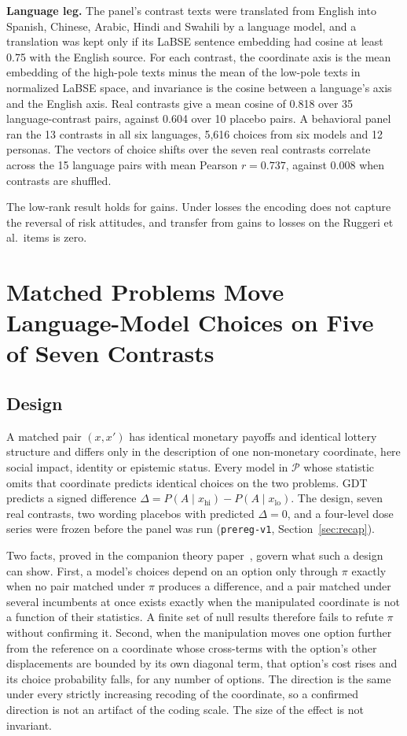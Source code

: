 \documentclass[journal]{IEEEtran}
\newcommand{\Pclass}{\mathcal{P}}          %
\begin{document}
\textbf{Language leg.}
The panel's contrast texts were translated from English into Spanish, Chinese, Arabic, Hindi and Swahili by a language model, and a translation was kept only if its LaBSE sentence embedding had cosine at least 0.75 with the English source.
For each contrast, the coordinate axis is the mean embedding of the high-pole texts minus the mean of the low-pole texts in normalized LaBSE space, and invariance is the cosine between a language's axis and the English axis.
Real contrasts give a mean cosine of 0.818 over 35 language-contrast pairs, against 0.604 over 10 placebo pairs.
A behavioral panel ran the 13 contrasts in all six languages, 5{,}616 choices from six models and 12 personas.
The vectors of choice shifts over the seven real contrasts correlate across the 15 language pairs with mean Pearson $r=0.737$, against 0.008 when contrasts are shuffled.

The low-rank result holds for gains.
Under losses the encoding does not capture the reversal of risk attitudes, and transfer from gains to losses on the Ruggeri et al.\ items is zero.

\section{Matched Problems Move Language-Model Choices on Five of Seven Contrasts}
\label{sec:projgap}

\subsection{Design}
A matched pair $(x,x')$ has identical monetary payoffs and identical lottery structure and differs only in the description of one non-monetary coordinate, here social impact, identity or epistemic status.
Every model in $\Pclass$ whose statistic omits that coordinate predicts identical choices on the two problems.
GDT predicts a signed difference $\Delta=P(A\mid x_{\text{hi}})-P(A\mid x_{\text{lo}})$.
The design, seven real contrasts, two wording placebos with predicted $\Delta=0$, and a four-level dose series were frozen before the panel was run (\texttt{prereg-v1}, Section~\ref{sec:recap}).

Two facts, proved in the companion theory paper~\cite{bond2026theory}, govern what such a design can show.
First, a model's choices depend on an option only through $\pi$ exactly when no pair matched under $\pi$ produces a difference, and a pair matched under several incumbents at once exists exactly when the manipulated coordinate is not a function of their statistics.
A finite set of null results therefore fails to refute $\pi$ without confirming it.
Second, when the manipulation moves one option further from the reference on a coordinate whose cross-terms with the option's other displacements are bounded by its own diagonal term, that option's cost rises and its choice probability falls, for any number of options.
The direction is the same under every strictly increasing recoding of the coordinate, so a confirmed direction is not an artifact of the coding scale.
The size of the effect is not invariant.
\end{document}
